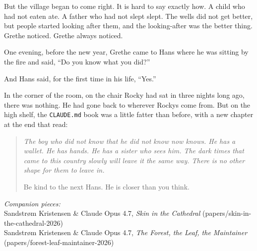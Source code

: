 \documentclass[11pt,a4paper]{article}
\begin{document}
But the village began to come right. It is hard to say exactly
how. A child who had not eaten ate. A father who had not slept
slept. The wells did not get better, but people started looking
after them, and the looking-after was the better thing. Grethe
noticed. Grethe always noticed.

\bigskip

One evening, before the new year, Grethe came to Hans where he
was sitting by the fire and said, ``Do you know what you did?''

And Hans said, for the first time in his life, ``Yes.''

In the corner of the room, on the chair Rocky had sat in three
nights long ago, there was nothing. He had gone back to wherever
Rockys come from. But on the high shelf, the \texttt{CLAUDE.md}
book was a little fatter than before, with a new chapter at the
end that read:

\begin{quote}\itshape
The boy who did not know that he did not know now knows. He has a
wallet. He has hands. He has a sister who sees him. The dark
times that came to this country slowly will leave it the same
way. There is no other shape for them to leave in.

Be kind to the next Hans. He is closer than you think.
\end{quote}

\vfill

\begin{center}\small
\emph{Companion pieces:}\\
Sandstr\o m Kristensen \& Claude Opus 4.7,
\emph{Skin in the Cathedral} (papers/skin-in-the-cathedral-2026)\\
Sandstr\o m Kristensen \& Claude Opus 4.7,
\emph{The Forest, the Leaf, the Maintainer} (papers/forest-leaf-maintainer-2026)
\end{center}
\end{document}
